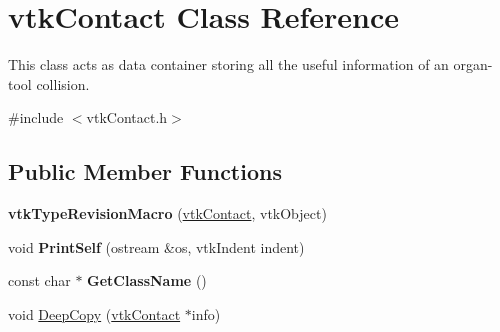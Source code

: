 \hypertarget{classvtkContact}{
\section{vtkContact Class Reference}
\label{classvtkContact}
}


This class acts as data container storing all the useful information of an organ-\/tool collision.  




{\ttfamily \#include $<$vtkContact.h$>$}

\subsection*{Public Member Functions}
\begin{DoxyCompactItemize}
\item 
\hypertarget{classvtkContact_ae57bab296a089fb62a3fb1951e49076e}{
{\bfseries vtkTypeRevisionMacro} (\hyperlink{classvtkContact}{vtkContact}, vtkObject)}
\label{classvtkContact_ae57bab296a089fb62a3fb1951e49076e}

\item 
\hypertarget{classvtkContact_acd0d47e3a3f2515ad82c109a054f0b95}{
void {\bfseries PrintSelf} (ostream \&os, vtkIndent indent)}
\label{classvtkContact_acd0d47e3a3f2515ad82c109a054f0b95}

\item 
\hypertarget{classvtkContact_a7547cfce378859302822189175735b2a}{
const char $\ast$ {\bfseries GetClassName} ()}
\label{classvtkContact_a7547cfce378859302822189175735b2a}

\item 
\hypertarget{classvtkContact_acff6607cd121ba61bdc2a92615cfb133}{
void \hyperlink{classvtkContact_acff6607cd121ba61bdc2a92615cfb133}{DeepCopy} (\hyperlink{classvtkContact}{vtkContact} $\ast$info)}
\label{classvtkContact_acff6607cd121ba61bdc2a92615cfb133}


\end{DoxyCompactItemize}
